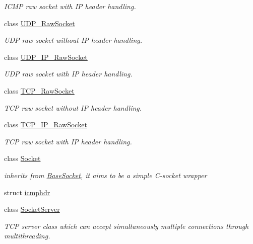 \begin{CompactItemize}
\begin{CompactList}\small\item\em ICMP raw socket with IP header handling. \item\end{CompactList}\item 
class \hyperlink{classsocketpp_1_1UDP__RawSocket}{UDP\_\-RawSocket}
\begin{CompactList}\small\item\em UDP raw socket without IP header handling. \item\end{CompactList}\item 
class \hyperlink{classsocketpp_1_1UDP__IP__RawSocket}{UDP\_\-IP\_\-RawSocket}
\begin{CompactList}\small\item\em UDP raw socket with IP header handling. \item\end{CompactList}\item 
class \hyperlink{classsocketpp_1_1TCP__RawSocket}{TCP\_\-RawSocket}
\begin{CompactList}\small\item\em TCP raw socket without IP header handling. \item\end{CompactList}\item 
class \hyperlink{classsocketpp_1_1TCP__IP__RawSocket}{TCP\_\-IP\_\-RawSocket}
\begin{CompactList}\small\item\em TCP raw socket with IP header handling. \item\end{CompactList}\item 
class \hyperlink{classsocketpp_1_1Socket}{Socket}
\begin{CompactList}\small\item\em inherits from \hyperlink{classsocketpp_1_1BaseSocket}{BaseSocket}, it aims to be a simple C-socket wrapper \item\end{CompactList}\item 
struct \hyperlink{structsocketpp_1_1icmphdr}{icmphdr}
\item 
class \hyperlink{classsocketpp_1_1SocketServer}{SocketServer}
\begin{CompactList}\small\item\em TCP server class which can accept simultaneously multiple connections through multithreading. \item\end{CompactList}\item 

\end{CompactItemize}
